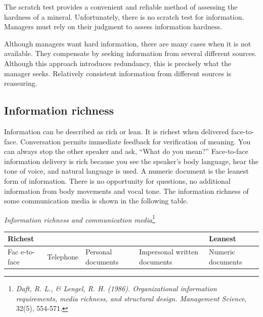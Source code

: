 \documentclass[
]{article}
\begin{document}
The scratch test provides a convenient and reliable method of assessing
the hardness of a mineral. Unfortunately, there is no scratch test for
information. Managers must rely on their judgment to assess information
hardness.

Although managers want hard information, there are many cases when it is
not available. They compensate by seeking information from several
different sources. Although this approach introduces redundancy, this is
precisely what the manager seeks. Relatively consistent information from
different sources is reassuring.

\hypertarget{information-richness}{%
\subsection*{Information richness}\label{information-richness}}

Information can be described as rich or lean. It is richest when
delivered face-to-face. Conversation permits immediate feedback for
verification of meaning. You can always stop the other speaker and ask,
``What do you mean?'' Face-to-face information delivery is rich because
you see the speaker's body language, hear the tone of voice, and natural
language is used. A numeric document is the leanest form of information.
There is no opportunity for questions, no additional information from
body movements and vocal tone. The information richness of some
communication media is shown in the following table.

\emph{Information richness and communication media}\footnote{\emph{Daft, R. L., \& Lengel, R. H. (1986). Organizational information
  requirements, media richness, and structural design. Management
  Science}, 32(5), 554-571.}

\begin{longtable}[]{@{}
  >{\raggedright\arraybackslash}p{}
  >{\raggedright\arraybackslash}p{}
  >{\raggedright\arraybackslash}p{}
  >{\raggedright\arraybackslash}p{}
  >{\raggedright\arraybackslash}p{}@{}}
\toprule
Richest & & & & Leanest \\
\midrule
\endhead
Fac
e-to-face & Telephone & Personal
documents & Impersonal
written
documents & Numeric
documents \\
\bottomrule
\end{longtable}
\end{document}
